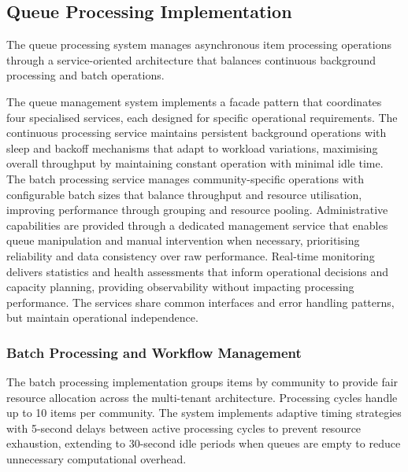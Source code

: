 

\subsection{Queue Processing Implementation} \label{subsection:queue_processing}

The queue processing system manages asynchronous item processing operations through a service-oriented architecture that balances continuous background processing and batch operations.

The queue management system implements a facade pattern that coordinates four specialised services, each designed for specific operational requirements. The continuous processing service maintains persistent background operations with sleep and backoff mechanisms that adapt to workload variations, maximising overall throughput by maintaining constant operation with minimal idle time. The batch processing service manages community-specific operations with configurable batch sizes that balance throughput and resource utilisation, improving performance through grouping and resource pooling. Administrative capabilities are provided through a dedicated management service that enables queue manipulation and manual intervention when necessary, prioritising reliability and data consistency over raw performance. Real-time monitoring delivers statistics and health assessments that inform operational decisions and capacity planning, providing observability without impacting processing performance. The services share common interfaces and error handling patterns, but maintain operational independence.

\subsubsection{Batch Processing and Workflow Management}

The batch processing implementation groups items by community to provide fair resource allocation across the multi-tenant architecture. Processing cycles handle up to 10 items per community. The system implements adaptive timing strategies with 5-second delays between active processing cycles to prevent resource exhaustion, extending to 30-second idle periods when queues are empty to reduce unnecessary computational overhead.

